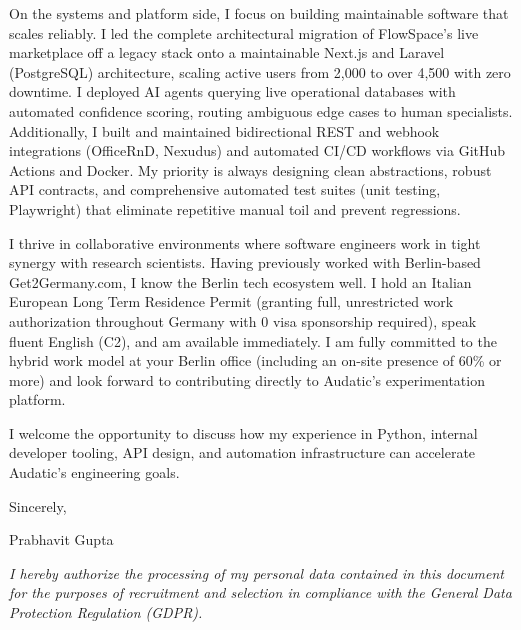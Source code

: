 \documentclass[11pt,a4paper]{article}
\begin{document}
On the systems and platform side, I focus on building maintainable software that scales reliably. I led the complete architectural migration of FlowSpace's live marketplace off a legacy stack onto a maintainable Next.js and Laravel (PostgreSQL) architecture, scaling active users from 2,000 to over 4,500 with zero downtime. I deployed AI agents querying live operational databases with automated confidence scoring, routing ambiguous edge cases to human specialists. Additionally, I built and maintained bidirectional REST and webhook integrations (OfficeRnD, Nexudus) and automated CI/CD workflows via GitHub Actions and Docker. My priority is always designing clean abstractions, robust API contracts, and comprehensive automated test suites (unit testing, Playwright) that eliminate repetitive manual toil and prevent regressions.

I thrive in collaborative environments where software engineers work in tight synergy with research scientists. Having previously worked with Berlin-based Get2Germany.com, I know the Berlin tech ecosystem well. I hold an Italian European Long Term Residence Permit (granting full, unrestricted work authorization throughout Germany with 0 visa sponsorship required), speak fluent English (C2), and am available immediately. I am fully committed to the hybrid work model at your Berlin office (including an on-site presence of 60\% or more) and look forward to contributing directly to Audatic's experimentation platform.

I welcome the opportunity to discuss how my experience in Python, internal developer tooling, API design, and automation infrastructure can accelerate Audatic's engineering goals.

Sincerely,

Prabhavit Gupta

\vspace{0.4em}
{\footnotesize \textit{I hereby authorize the processing of my personal data contained in this document for the purposes of recruitment and selection in compliance with the General Data Protection Regulation (GDPR).}\par}
\end{document}
